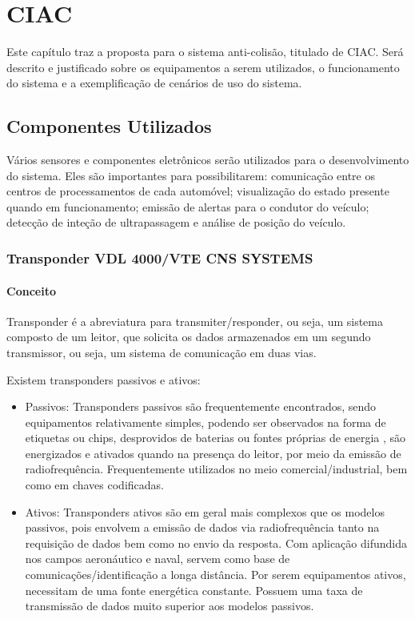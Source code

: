 \chapter[CIAC]{CIAC}
Este capítulo traz a proposta para o sistema anti-colisão, titulado de CIAC.
Será descrito e justificado sobre os equipamentos a serem utilizados, o funcionamento
do sistema e a exemplificação de cenários de uso do sistema.

\section{Componentes Utilizados}

Vários sensores e componentes eletrônicos serão utilizados para o desenvolvimento
do sistema. Eles são importantes para possibilitarem: comunicação entre
os centros de processamentos de cada automóvel; visualização do estado presente
quando em funcionamento; emissão de alertas para o condutor do veículo; detecção
de inteção de ultrapassagem e análise de posição do veículo.

\subsection{Transponder VDL 4000/VTE CNS SYSTEMS}

\subsubsection{Conceito}
Transponder é a abreviatura para transmiter/responder, ou seja, um sistema
composto de um leitor, que solicita os dados armazenados em um segundo
transmissor, ou seja, um sistema de comunicação em duas vias.

Existem transponders passivos e ativos:

\begin{itemize}
  \item Passivos: Transponders passivos são frequentemente encontrados,
  sendo equipamentos relativamente simples, podendo ser observados na forma
  de etiquetas ou chips, desprovidos de baterias ou fontes próprias de energia
  , são energizados e ativados quando na presença do leitor, por meio da
   emissão de radiofrequência. Frequentemente utilizados no meio
   comercial/industrial, bem como em chaves codificadas.
  \item Ativos: Transponders ativos são em geral mais complexos que os
  modelos passivos, pois envolvem a emissão de dados via radiofrequência
  tanto na requisição de dados bem como no envio da resposta. Com aplicação
  difundida nos campos aeronáutico e naval, servem como base de
  comunicações/identificação a longa distância. Por serem equipamentos ativos,
  necessitam de uma fonte energética constante. Possuem uma taxa de
  transmissão de dados muito superior aos modelos passivos.
\end{itemize}

